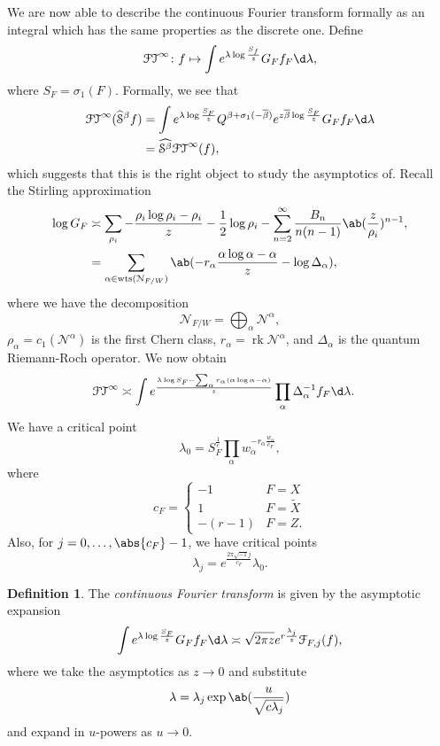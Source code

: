 \documentclass[leqno, openany]{memoir}
\theoremstyle{definition}
\newtheorem{defn}[thm]{Definition}
\theoremstyle{remark}
\theoremstyle{plain}
\theoremstyle{definition}
\theoremstyle{remark}
\newcommand{\mc}[1]{\mathcal{#1}}
\newcommand{\mr}[1]{\mathrm{#1}}
\newcommand{\on}[1]{\operatorname{#1}}
\newcommand{\ol}[1]{\overline{#1}}
\newcommand{\wt}[1]{\widetilde{#1}}
\newcommand{\wh}[1]{\widehat{#1}}
\begin{document}
We are now able to describe the continuous Fourier transform formally as an integral which has the same properties as the discrete one. Define
\[ \mc{FT}^{\infty} \colon f \mapsto \int e^{\lambda \log \frac{S_f}{z}} G_F f_F \d \lambda, \]
where $S_F = \sigma_1(F)$. Formally, we see that
\begin{align*}
    \mc{FT}^{\infty}(\wh{\mc{S}}^{\beta} f) &= \int e^{\lambda \log \frac{S_F}{z}} Q^{\beta + \sigma_1(-\ol{\beta})} e^{z \ol{\beta} \log \frac{S_F}{z}} G_F f_F \d \lambda \\
    &= \wh{\mc{S}^{\beta}} \mc{FT}^{\infty}(f),
\end{align*}
which suggests that this is the right object to study the asymptotics of. Recall the Stirling approximation
\begin{align*}
    \log G_F &\asymp \sum_{\rho_i}- \frac{\rho_i \log \rho_i - \rho_i}{z} - \frac{1}{2}\log \rho_i - \sum_{n=2}^{\infty} \frac{B_n}{n(n-1)} \ab(\frac{z}{\rho_i})^{n-1}, \\
    &= \sum_{\alpha \in \mr{wts}(\mc{N}_{F/W})} \ab(- r_{\alpha} \frac{\alpha \log \alpha - \alpha}{z} - \log \Delta_{\alpha}),
\end{align*}
where we have the decomposition
\[ \mc{N}_{F/W} = \bigoplus_{\alpha} \mc{N}^{\alpha}, \]
$\rho_{\alpha} = c_1(\mc{N}^{\alpha})$ is the first Chern class, $r_{\alpha} = \on{rk} \mc{N}^{\alpha}$, and $\Delta_{\alpha}$ is the quantum Riemann-Roch operator. We now obtain
\begin{align*}
    \mc{FT}^{\infty} &\asymp \int e^{\frac{\lambda \log S_F - \sum_{\alpha} r_{\alpha}(\alpha \log \alpha - \alpha)}{z}} \prod_{\alpha} \Delta_{\alpha}^{-1} f_F \d \lambda.
\end{align*}
We have a critical point
\[ \lambda_0 = S_F^{\frac{1}{c}} \prod_{\alpha} w_{\alpha}^{-r_{\alpha} \frac{w_{\alpha}}{c_F}}, \]
where
\[ c_F = \begin{cases}
    -1 & F=X \\
    1 & F=\wt{X} \\
    -(r-1) & F=Z.
\end{cases}
\]
Also, for $j = 0, \ldots, \abs{c_F}-1$, we have critical points
\[ \lambda_j = e^{\frac{2\pi \sqrt{-1} j}{c_F}} \lambda_0. \]

\begin{defn}
    The \textit{continuous Fourier transform} is given by the asymptotic expansion
    \[ \int e^{\lambda \log \frac{S_F}{z}} G_F f_F \d \lambda \asymp \sqrt{2\pi z} e^{r\frac{\lambda_j}{z}} \mc{F}_{F,j}(f), \]
    where we take the asymptotics as $z \to 0$ and substitute
    \[ \lambda = \lambda_j \exp\ab(\frac{u}{\sqrt{c \lambda_j}}) \]
    and expand in $u$-powers as $u \to 0$.
\end{defn}
\end{document}

